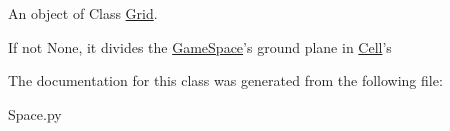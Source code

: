 \-An object of \-Class \hyperlink{classSpace_1_1Grid}{\-Grid}. 

\-If not \-None, it divides the \hyperlink{classSpace_1_1GameSpace}{\-Game\-Space}'s ground plane in \hyperlink{classSpace_1_1Cell}{\-Cell}'s 

\-The documentation for this class was generated from the following file\-:\begin{DoxyCompactItemize}
\item 
\-Space.\-py\end{DoxyCompactItemize}
